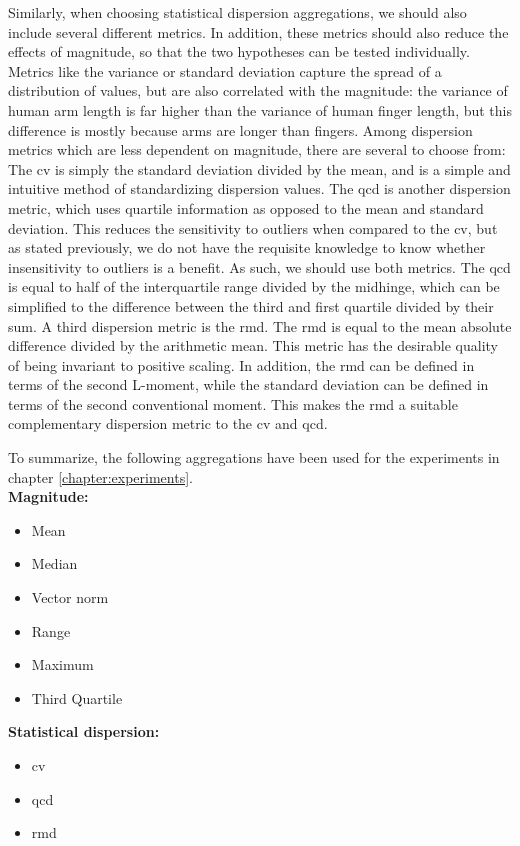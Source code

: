 \documentclass[UKenglish]{uiomasterthesis} %
\theoremstyle{definition}
\begin{document}
Similarly, when choosing statistical dispersion aggregations, we should also include several different metrics. In addition, these metrics should also reduce the effects of magnitude, so that the two hypotheses can be tested individually. Metrics like the variance or standard deviation capture the spread of a distribution of values, but are also correlated with the magnitude: the variance of human arm length is far higher than the variance of human finger length, but this difference is mostly because arms are longer than fingers. Among dispersion metrics which are less dependent on magnitude, there are several to choose from: The \ac{cv} is simply the standard deviation divided by the mean, and is a simple and intuitive method of standardizing dispersion values. The \ac{qcd} is another dispersion metric, which uses quartile information as opposed to the mean and standard deviation. This reduces the sensitivity to outliers when compared to the \ac{cv}, but as stated previously, we do not have the requisite knowledge to know whether insensitivity to outliers is a benefit. As such, we should use both metrics. The \ac{qcd} is equal to half of the interquartile range divided by the midhinge, which can be simplified to the difference between the third and first quartile divided by their sum. A third dispersion metric is the \ac{rmd}. The \ac{rmd} is equal to the mean absolute difference divided by the arithmetic mean. This metric has the desirable quality of being invariant to positive scaling. In addition, the \ac{rmd} can be defined in terms of the second L-moment, while the standard deviation can be defined in terms of the second conventional moment. This makes the \ac{rmd} a suitable complementary dispersion metric to the \ac{cv} and \ac{qcd}.

To summarize, the following aggregations have been used for the experiments in chapter \ref{chapter:experiments}. \\

\textbf{Magnitude:}
\begin{itemize}
    \itemsep0em
    \item Mean
    \item Median
    \item Vector norm
    \item Range
    \item Maximum
    \item Third Quartile
\end{itemize}

\textbf{Statistical dispersion:}
\begin{itemize}
    \itemsep0em
    \item \acf{cv}
    \item \acf{qcd}
    \item \acf{rmd}
\end{itemize}
\end{document}

